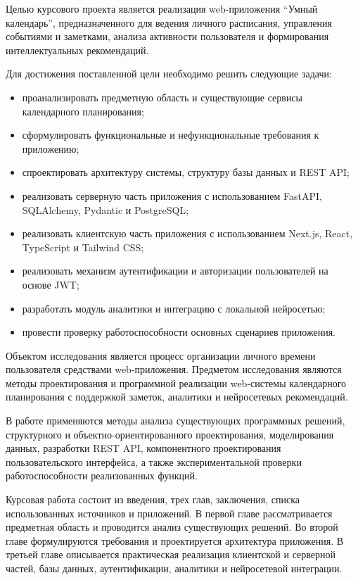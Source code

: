 \documentclass[14pt,a4paper]{extreport}
\begin{document}
Целью курсового проекта является реализация web-приложения ``Умный календарь'', предназначенного для ведения личного расписания, управления событиями и заметками, анализа активности пользователя и формирования интеллектуальных рекомендаций.

Для достижения поставленной цели необходимо решить следующие задачи:
\begin{itemize}
    \item проанализировать предметную область и существующие сервисы календарного планирования;
    \item сформулировать функциональные и нефункциональные требования к приложению;
    \item спроектировать архитектуру системы, структуру базы данных и REST API;
    \item реализовать серверную часть приложения с использованием FastAPI, SQLAlchemy, Pydantic и PostgreSQL;
    \item реализовать клиентскую часть приложения с использованием Next.js, React, TypeScript и Tailwind CSS;
    \item реализовать механизм аутентификации и авторизации пользователей на основе JWT;
    \item разработать модуль аналитики и интеграцию с локальной нейросетью;
    \item провести проверку работоспособности основных сценариев приложения.
\end{itemize}

Объектом исследования является процесс организации личного времени пользователя средствами web-приложения. Предметом исследования являются методы проектирования и программной реализации web-системы календарного планирования с поддержкой заметок, аналитики и нейросетевых рекомендаций.

В работе применяются методы анализа существующих программных решений, структурного и объектно-ориентированного проектирования, моделирования данных, разработки REST API, компонентного проектирования пользовательского интерфейса, а также экспериментальной проверки работоспособности реализованных функций.

Курсовая работа состоит из введения, трех глав, заключения, списка использованных источников и приложений. В первой главе рассматривается предметная область и проводится анализ существующих решений. Во второй главе формулируются требования и проектируется архитектура приложения. В третьей главе описывается практическая реализация клиентской и серверной частей, базы данных, аутентификации, аналитики и нейросетевой интеграции.
\end{document}
